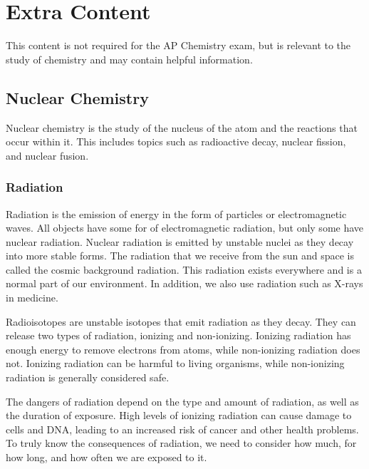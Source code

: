 \section{Extra Content}
This content is not required for the AP Chemistry exam, but is relevant to the study of chemistry and may contain helpful information.
\subsection{Nuclear Chemistry}
Nuclear chemistry is the study of the nucleus of the atom and the reactions that occur within it. This includes topics such as radioactive decay, nuclear fission, and nuclear fusion. 
\subsubsection{Radiation}
Radiation is the emission of energy in the form of particles or electromagnetic waves. All objects have some for of electromagnetic radiation, but only some have nuclear radiation. Nuclear radiation is emitted by unstable nuclei as they decay into more stable forms.
The radiation that we receive from the sun and space is called the cosmic background radiation. This radiation exists everywhere and is a normal part of our environment. In addition, we also use radiation such as X-rays in medicine. 

Radioisotopes are unstable isotopes that emit radiation as they decay. They can release two types of radiation, ionizing and non-ionizing. Ionizing radiation has enough energy to remove electrons from atoms, while non-ionizing radiation does not. Ionizing radiation can be harmful to living organisms, while non-ionizing radiation is generally considered safe.

The dangers of radiation depend on the type and amount of radiation, as well as the duration of exposure. High levels of ionizing radiation can cause damage to cells and DNA, leading to an increased risk of cancer and other health problems. To truly know the consequences of radiation, we need to consider how much, for how long, and how often we are exposed to it.
